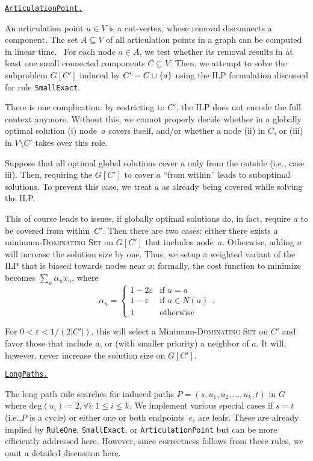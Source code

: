 \documentclass[a4paper, USenglish, cleveref, autoref, thm-restate, noalgorithm2e]{socg-lipics-v2021}
\newcommand{\set}[1]{\ensuremath\left\{#1\right\}}
\def\deg{\ensuremath{\mathrm{deg}}}
\newcommand{\Dom}{\textsc{Dominating Set}\xspace}
\newcommand{\ie}{i.e.,\xspace}
\newcommand{\Rule}[1]{{\texttt{#1}}}
\def\defrule#1{%
    \medskip
    
    \noindent
    \underline{\texttt{#1.}}
}
\begin{document}
\defrule{ArticulationPoint}
An articulation point $u \in V$ is a cut-vertex, whose removal disconnects a component.
The set $A \subseteq V$ of all articulation points in a graph can be computed in linear time.~\cite{DBLP:journals/cacm/HopcroftT73}
%
For each node $a \in A$, we test whether its removal results in at least one small connected components $C \subseteq V$.
Then, we attempt to solve the subproblem $G[C']$ induced by $C' = C \cup \set{a}$ using the ILP formulation discussed for rule \Rule{SmallExact}.

There is one complication: by restricting to $C'$, the ILP does not encode the full context anymore.
Without this, we cannot properly decide whether in a globally optimal solution (i) node~$a$ covers itself, and/or whether a node (ii) in $C$, or (iii) in $V \setminus C'$ takes over this role.

Suppose that all optimal global solutions cover $a$ only from the outside (\ie case iii).
Then, requiring the $G[C']$ to cover $a$ ``from within'' leads to suboptimal solutions.
To prevent this case, we treat $a$ as already being covered while solving the ILP.

This of course leads to issues, if globally optimal solutions do, in fact, require $a$ to be covered from within~$C'$.
Then there are two cases: either there exists a minimum-\Dom on $G[C']$ that includes node~$a$.
Otherwise, adding $a$ will increase the solution size by one.
Thus, we setup a weighted variant of the ILP that is biased towards nodes near $a$;
formally, the cost function to minimize becomes $\sum_{u} \alpha_u x_u$, where
\begin{equation}
    \alpha_u = \begin{cases}
        1 - 2\varepsilon & \text{if } u=a        \\
        1 - \varepsilon  & \text{if } u \in N(a) \\
        1                & \text{otherwise}
    \end{cases}.
\end{equation}

For $0 < \varepsilon < 1/(2|C'|)$, this will select a Minimum-\Dom on $C'$ and favor those that include $a$, or (with smaller priority) a neighbor of $a$.
It will, however, never increase the solution size on $G[C']$.

\defrule{LongPaths}
The long path rule searches for induced paths $P = (s, u_1, u_2, \ldots, u_k, t)$ in $G$ where $\deg(u_i) = 2, \forall i\colon 1 \le i \le k$.
We implement various special cases if $s = t$ (\ie $P$ is a cycle) or either one or both endpoints~$e_i$ are leafs.
These are already implied by \Rule{RuleOne}, \Rule{SmallExact}, or \Rule{ArticulationPoint} but can be more efficiently addressed here.
However, since correctness follows from these rules, we omit a detailed discussion here.
\end{document}

